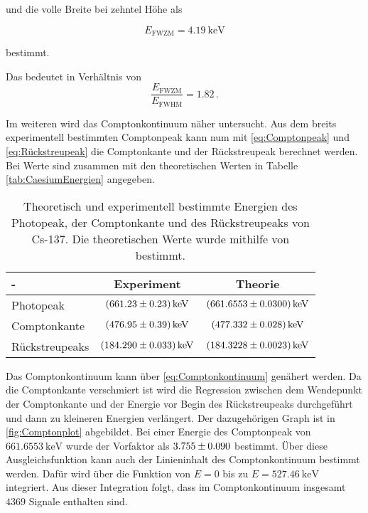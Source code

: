 und die volle Breite bei zehntel Höhe als

\begin{equation*}
    E_{\text{FWZM}} =  \SI{4.19}{\kilo\eV}
\end{equation*}

bestimmt. 

Das bedeutet in Verhältnis von 
\begin{equation*}
    \frac{E_{\text{FWZM}}}{E_{\text{FWHM}}} = 1.82\,.
\end{equation*}

Im weiteren wird das Comptonkontinuum näher untersucht.
Aus dem breits experimentell bestimmten Comptonpeak kann num mit \autoref{eq:Comptonpeak} und \autoref{eq:Rückstreupeak} %
 die Comptonkante und der Rückstreupeak berechnet werden.
Bei Werte sind zusammen mit den theoretischen Werten in Tabelle \autoref{tab:CaesiumEnergien} angegeben.

\begin{table}
    \centering
    \caption{Theoretisch und experimentell bestimmte Energien des Photopeak, der Comptonkante und des Rückstreupeaks von Cs-137. Die theoretischen Werte wurde mithilfe von \cite{LNHB} bestimmt.}
    \label{tab:CaesiumEnergien}
    \begin{tabular}{l S[table-format=3.2(4), separate-uncertainty] S[table-format=3.4(4), separate-uncertainty]}
        \toprule
        {-} & {Experiment} & {Theorie}\\
        \midrule 
        Photopeak       & $\SI{661.23 \pm 0.23 }{\kilo\eV}$ & $\SI{661.6553 \pm 0.030}{\kilo\eV}$  \\ 
        Comptonkante    & $\SI{476.95 \pm 0.39 }{\kilo\eV}$ & $\SI{477.332 \pm 0.028}{\kilo\eV}$    \\ 
        Rückstreupeaks  & $\SI{184.290 \pm 0.033 }{\kilo\eV}$ & $\SI{184.3228 \pm 0.0023}{\kilo\eV}$  \\ 
        \bottomrule
    \end{tabular}
\end{table}

Das Comptonkontinuum kann über \autoref{eq:Comptonkontinuum} %
genähert werden. 
Da die Comptonkante verschmiert ist wird die Regression zwischen dem Wendepunkt der Comptonkante und der Energie vor Begin des Rückstreupeaks durchgeführt und dann zu kleineren Energien verlängert.
Der dazugehörigen Graph ist in \autoref{fig:Comptonplot} abgebildet. 
Bei einer Energie des Comptonpeak von $\SI{661.6553}{\kilo\eV}$ wurde der Vorfaktor als $\num{3.755 \pm 0.090}$ bestimmt.
Über diese Ausgleichsfunktion kann auch der Linieninhalt des Comptonkontinuum bestimmt werden.
Dafür wird über die Funktion von $E = 0$ bis zu $E = \SI{527.46}{\kilo\eV}$ integriert.
Aus dieser Integration folgt, dass im Comptonkontinuum insgesamt $\num{4369}$ Signale enthalten sind.\\ 

